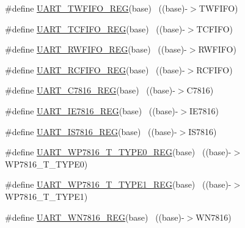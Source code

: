 \begin{DoxyCompactItemize}
\#define \hyperlink{group___u_a_r_t___register___accessor___macros_ga6204d5850da243402d242d414cdb66f0}{U\+A\+R\+T\+\_\+\+T\+W\+F\+I\+F\+O\+\_\+\+R\+EG}(base)                                    ~((base)-\/$>$T\+W\+F\+I\+FO)
\item 
\#define \hyperlink{group___u_a_r_t___register___accessor___macros_ga3c989ec09106d40a7499376ee50043cb}{U\+A\+R\+T\+\_\+\+T\+C\+F\+I\+F\+O\+\_\+\+R\+EG}(base)                                    ~((base)-\/$>$T\+C\+F\+I\+FO)
\item 
\#define \hyperlink{group___u_a_r_t___register___accessor___macros_ga3835d8ca2bff395228fd298041588e27}{U\+A\+R\+T\+\_\+\+R\+W\+F\+I\+F\+O\+\_\+\+R\+EG}(base)                                    ~((base)-\/$>$R\+W\+F\+I\+FO)
\item 
\#define \hyperlink{group___u_a_r_t___register___accessor___macros_ga45b1614543eafe052567800963874056}{U\+A\+R\+T\+\_\+\+R\+C\+F\+I\+F\+O\+\_\+\+R\+EG}(base)                                    ~((base)-\/$>$R\+C\+F\+I\+FO)
\item 
\#define \hyperlink{group___u_a_r_t___register___accessor___macros_ga21a48aa0a2ba6e0202b47d6ff091e689}{U\+A\+R\+T\+\_\+\+C7816\+\_\+\+R\+EG}(base)                                      ~((base)-\/$>$C7816)
\item 
\#define \hyperlink{group___u_a_r_t___register___accessor___macros_ga5b90f8b81565b881d6c249581ebcbb75}{U\+A\+R\+T\+\_\+\+I\+E7816\+\_\+\+R\+EG}(base)                                    ~((base)-\/$>$I\+E7816)
\item 
\#define \hyperlink{group___u_a_r_t___register___accessor___macros_ga70744022bbc57cc63807b79daa7b3341}{U\+A\+R\+T\+\_\+\+I\+S7816\+\_\+\+R\+EG}(base)                                    ~((base)-\/$>$I\+S7816)
\item 
\#define \hyperlink{group___u_a_r_t___register___accessor___macros_gae15cd9484cdbcf68a1ca6a3970c22aed}{U\+A\+R\+T\+\_\+\+W\+P7816\+\_\+\+T\+\_\+\+T\+Y\+P\+E0\+\_\+\+R\+EG}(base)                    ~((base)-\/$>$W\+P7816\+\_\+\+T\+\_\+\+T\+Y\+P\+E0)
\item 
\#define \hyperlink{group___u_a_r_t___register___accessor___macros_gaf125f8e0b4618c70042e9007e77775de}{U\+A\+R\+T\+\_\+\+W\+P7816\+\_\+\+T\+\_\+\+T\+Y\+P\+E1\+\_\+\+R\+EG}(base)                    ~((base)-\/$>$W\+P7816\+\_\+\+T\+\_\+\+T\+Y\+P\+E1)
\item 
\#define \hyperlink{group___u_a_r_t___register___accessor___macros_gaf7886bbd2d26e698f9c3e2037c2f9668}{U\+A\+R\+T\+\_\+\+W\+N7816\+\_\+\+R\+EG}(base)                                    ~((base)-\/$>$W\+N7816)

\end{DoxyCompactItemize}
